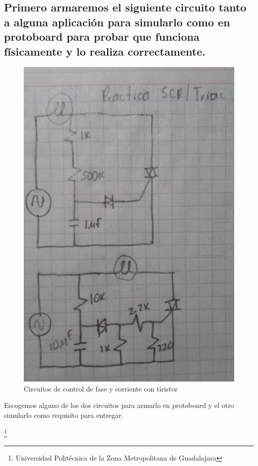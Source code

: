 \documentclass[10pt,a4paper]{article}
\begin{document}
\subsection{Primero armaremos el siguiente circuito tanto a alguna aplicación para simularlo como en protoboard para probar que funciona físicamente y lo realiza correctamente.}
\begin{figure}[hbtp]
\centering
\includegraphics[scale=0.2]{Pictures/Circuitos.jpeg}
\caption{Circuitos de control de fase y corriente con tiristor}
\end{figure}
Escogemos alguno de los dos circuitos para armarlo en protoboard y el otro simularlo como requisito para entregar.

\footnote{Universidad Politécnica de la Zona Metropolitana de Guadalajara}
\end{document}
